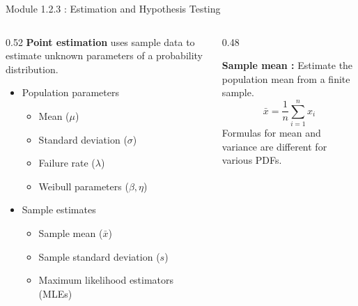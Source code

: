\documentclass{beamer}
\begin{document}
\begin{frame}{Module 1.2.3 : Estimation and Hypothesis Testing}
\begin{columns}[T]
\begin{column}{0.52\textwidth}
\small
\textbf{Point estimation} uses sample data to estimate
unknown parameters of a probability distribution.
\begin{itemize}
\small
\item Population parameters
\begin{itemize}
\scriptsize
\item Mean ($\mu$)
\item Standard deviation ($\sigma$)
\item Failure rate ($\lambda$)
\item Weibull parameters ($\beta,\eta$)
\end{itemize}
\item Sample estimates
\begin{itemize}
\scriptsize
\item Sample mean ($\bar{x}$)
\item Sample standard deviation ($s$)
\item Maximum likelihood estimators (MLEs)
\end{itemize}
\end{itemize}
\end{column}
\begin{column}{0.48\textwidth}
\scriptsize
\textbf{Sample mean : } Estimate the population mean from a finite sample.
\begin{equation}
\bar{x}=\frac{1}{n}\sum_{i=1}^n x_i
\end{equation}
Formulas for mean and variance are different for various PDFs.
\end{column}
\end{columns}
\end{frame}
\end{document}
